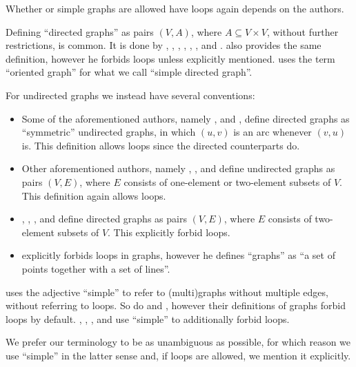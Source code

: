\begin{remark}\label{rem:simple_graphs}
  Whether or simple graphs are allowed have loops again depends on the authors.

  Defining \enquote{directed graphs} as pairs \( (V, A) \), where \( A \subseteq V \times V \), without further restrictions, is common. It is done by , , , , , ,  and .  also provides the same definition, however he forbids loops unless explicitly mentioned.  uses the term \enquote{oriented graph} for what we call \enquote{simple directed graph}.

  For undirected graphs we instead have several conventions:
  \begin{itemize}
    \item Some of the aforementioned authors, namely ,  and , define directed graphs as \enquote{symmetric} undirected graphs, in which \( (u, v) \) is an arc whenever \( (v, u) \) is. This definition allows loops since the directed counterparts do.

    \item Other aforementioned authors, namely , , and  define undirected graphs as pairs \( (V, E) \), where \( E \) consists of one-element or two-element subsets of \( V \). This definition again allows loops.

    \item {}, , ,  and  define directed graphs as pairs \( (V, E) \), where \( E \) consists of two-element subsets of \( V \). This explicitly forbid loops.

    \item {} explicitly forbids loops in graphs, however he defines \enquote{graphs} as \enquote{a set of points together with a set of lines}.
  \end{itemize}

   uses the adjective \enquote{simple} to refer to (multi)graphs without multiple edges, without referring to loops. So do  and , however their definitions of graphs forbid loops by default. , , ,  and  use \enquote{simple} to additionally forbid loops.

  We prefer our terminology to be as unambiguous as possible, for which reason we use \enquote{simple} in the latter sense and, if loops are allowed, we mention it explicitly.
\end{remark}

